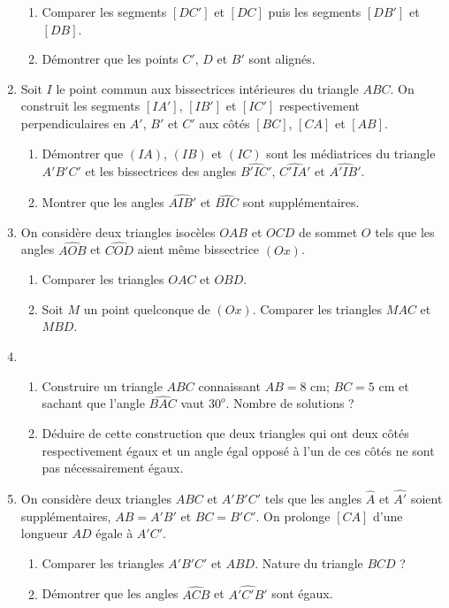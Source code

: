 \documentclass[12 pt]{report}
\theoremstyle{plain}
\newcounter{n}
\begin{document}
\begin{enumerate}
\begin{enumerate}
 \item Comparer les segments $[DC']$ et $[DC]$ puis les segments $[DB']$ et $[DB]$.
 \item Démontrer que les points $C'$, $D$ et $B'$ sont alignés.
 \end{enumerate}
 \item Soit $I$ le point commun aux bissectrices intérieures du triangle $ABC$. 
 On construit les segments $[IA']$, $[IB']$ et $[IC']$ respectivement perpendiculaires en $A'$, $B'$ et $C'$ aux côtés $[BC]$, $[CA]$ et $[AB]$. 
 \begin{enumerate}
 \item Démontrer que $(IA)$, $(IB)$ et $(IC)$ sont les médiatrices du triangle $A'B'C'$ et les bissectrices des angles $\widehat{B'IC'}$, $\widehat{C'IA'}$ et
 $\widehat{A'IB'}$.
 \item Montrer que les angles $\widehat{AIB'}$ et $\widehat{BIC}$ sont supplémentaires.
 \end{enumerate}
 \item On considère deux triangles isocèles $OAB$ et $OCD$ de sommet $O$ tels que les angles $\widehat{AOB}$ et $\widehat{COD}$ aient même bissectrice $(Ox)$. \begin{enumerate}
 \item Comparer les triangles $OAC$ et $OBD$. 
 \item Soit $M$ un point quelconque de $(Ox)$. Comparer les triangles $MAC$ et $MBD$.
 \end{enumerate}
 \item\begin{enumerate}
 \item Construire un triangle $ABC$ connaissant $AB= 8$ cm; $BC= 5$ cm et sachant que l'angle $\widehat{BAC}$ vaut $30^o$. Nombre de solutions ?
 \item Déduire de cette construction que deux triangles qui ont deux côtés respectivement égaux et un angle égal opposé à l'un de ces côtés ne sont pas nécessairement égaux.
\end{enumerate}  
\item On considère deux triangles $ABC$ et $A'B'C'$ tels que les angles $\widehat{A}$ et $\widehat{A'}$ soient supplémentaires, $AB=A'B'$ et $BC=B'C'$. On prolonge $[CA]$
d'une longueur $AD$ égale à $A'C'$.\begin{enumerate}
\item Comparer les triangles $A'B'C'$ et $ABD$. Nature du triangle $BCD$ ? 
\item Démontrer que les angles $\widehat{ACB}$ et $\widehat{A'C'B'}$ sont égaux.

\end{enumerate}
\end{enumerate}
\end{document}
